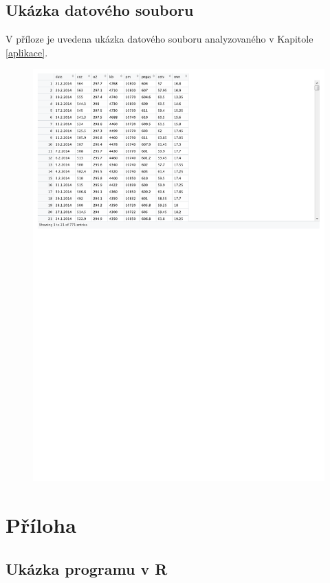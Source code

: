 \documentclass[a4paper,12pt]{report}
\theoremstyle{definition} \newtheorem{definice}[veta]{Definice}
\theoremstyle{remark}
\begin{document}
\section*{Ukázka datového souboru}
V příloze je uvedena ukázka datového souboru analyzovaného v Kapitole \ref{aplikace}.
\begin{figure}[!htbp]
  \centering 
\includegraphics[width=12.5cm, clip, trim= 0 510 277 10]{IMG/data_v2.pdf}
\end{figure}

\chapter[Příloha -- Ukázka programů]{Příloha}
\section*{Ukázka programu v R}
\end{document}
